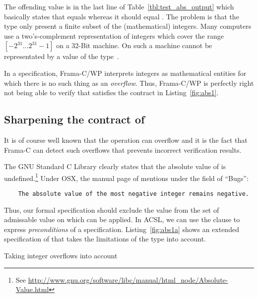 The offending value is in the last line of Table~\ref{tbl:test_abs_output}
which basically states that  equals 
whereas it should equal .
The problem is that the type  only present a 
finite subset of the (mathematical) integers.
Many computers use a two's-complement representation of integers
which cover the range $[-2^{31}\ldots 2^{31}-1]$ on a 32-Bit machine.
On such a machine  cannot be  representated by a value
of the type~.

In a specification, Frama-C\slash WP interprets integers as mathematical entities
for which there is no such thing as an \emph{overflow}.
Thus, Frama-C\slash WP is perfectly right not being able to verify that 
satisfies the contract in Listing~\ref{fig:abs1}.

\subsection{Sharpening the contract of }

It is of course well known that the operation  can overflow
and it is the fact that Frama-C can detect such overflows that 
prevents incorrect verification results.

The GNU Standard C Library clearly states that the absolute value of
 is undefined.\footnote{%
  See \url{http://www.gnu.org/software/libc/manual/html_node/Absolute-Value.html}
}
Under \textsf{OSX}, the manual page of  mentions under the field of ``Bugs'':
%
\begin{small}
\begin{verbatim}
    The absolute value of the most negative integer remains negative.
\end{verbatim}
\end{small}

Thus, our formal specification should exclude the value 
from the set of admissable value on which  can be applied.
In ACSL, we can use the  clause to express \emph{preconditions}
of a specification.
Listing~\ref{fig:abs1a} shows an extended specification of 
that takes the limitations of the type  into account.

\begin{listing}[hbt]
\begin{minipage}{\textwidth}

\end{minipage}
\caption{\label{fig:abs1a} Taking integer overflows into account}
\end{listing}

